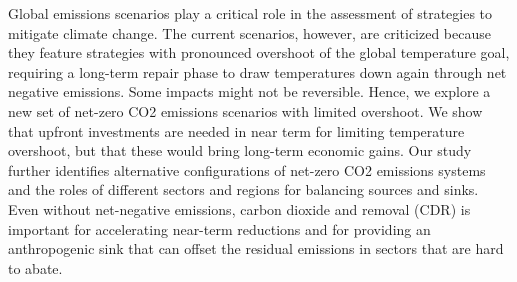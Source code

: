 Global emissions scenarios play a critical role in the assessment of strategies to mitigate climate change. The current scenarios, however, are criticized because they feature strategies with pronounced overshoot of the global temperature goal, requiring a long-term repair phase to draw temperatures down again through net negative emissions. Some impacts might not be reversible. Hence, we explore a new set of net-zero CO2 emissions scenarios with limited overshoot. We show that upfront investments are needed in near term for limiting temperature overshoot, but that these would bring long-term economic gains. Our study further identifies alternative configurations of net-zero CO2 emissions systems and the roles of different sectors and regions for balancing sources and sinks. Even without net-negative emissions, carbon dioxide and removal (CDR) is important for accelerating near-term reductions and for providing an anthropogenic sink that can offset the residual emissions in sectors that are hard to abate.
